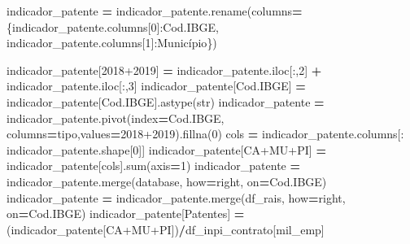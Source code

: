 \documentclass[
  12,
  dvipsnames]{article}
\newenvironment{Shaded}{\begin{snugshade}}{\end{snugshade}}
\newcommand{\BuiltInTok}[1]{#1}
\newcommand{\DecValTok}[1]{\textcolor[rgb]{0.00,0.00,0.81}{#1}}
\newcommand{\NormalTok}[1]{#1}
\newcommand{\OperatorTok}[1]{\textcolor[rgb]{0.81,0.36,0.00}{\textbf{#1}}}
\newcommand{\StringTok}[1]{\textcolor[rgb]{0.31,0.60,0.02}{#1}}
\begin{document}
\begin{Shaded}
\begin{Highlighting}[]
\NormalTok{indicador\_patente }\OperatorTok{=}\NormalTok{ indicador\_patente.rename(columns}\OperatorTok{=}\NormalTok{\{indicador\_patente.columns[}\DecValTok{0}\NormalTok{]:}\StringTok{\textquotesingle{}Cod.IBGE\textquotesingle{}}\NormalTok{,}
\NormalTok{                                                      indicador\_patente.columns[}\DecValTok{1}\NormalTok{]:}\StringTok{\textquotesingle{}Município\textquotesingle{}}\NormalTok{\})}

\NormalTok{indicador\_patente[}\StringTok{\textquotesingle{}2018+2019\textquotesingle{}}\NormalTok{] }\OperatorTok{=}\NormalTok{ indicador\_patente.iloc[:,}\DecValTok{2}\NormalTok{] }\OperatorTok{+}\NormalTok{ indicador\_patente.iloc[:,}\DecValTok{3}\NormalTok{]}
\NormalTok{indicador\_patente[}\StringTok{\textquotesingle{}Cod.IBGE\textquotesingle{}}\NormalTok{] }\OperatorTok{=}\NormalTok{ indicador\_patente[}\StringTok{\textquotesingle{}Cod.IBGE\textquotesingle{}}\NormalTok{].astype(}\BuiltInTok{str}\NormalTok{)}
\NormalTok{indicador\_patente }\OperatorTok{=}\NormalTok{ indicador\_patente.pivot(index}\OperatorTok{=}\StringTok{\textquotesingle{}Cod.IBGE\textquotesingle{}}\NormalTok{, columns}\OperatorTok{=}\StringTok{\textquotesingle{}tipo\textquotesingle{}}\NormalTok{,values}\OperatorTok{=}\StringTok{\textquotesingle{}2018+2019\textquotesingle{}}\NormalTok{).fillna(}\DecValTok{0}\NormalTok{)}
\NormalTok{cols }\OperatorTok{=}\NormalTok{ indicador\_patente.columns[: indicador\_patente.shape[}\DecValTok{0}\NormalTok{]]}
\NormalTok{indicador\_patente[}\StringTok{\textquotesingle{}CA+MU+PI\textquotesingle{}}\NormalTok{] }\OperatorTok{=}\NormalTok{ indicador\_patente[cols].}\BuiltInTok{sum}\NormalTok{(axis}\OperatorTok{=}\DecValTok{1}\NormalTok{)}
\NormalTok{indicador\_patente }\OperatorTok{=}\NormalTok{ indicador\_patente.merge(database, how}\OperatorTok{=}\StringTok{\textquotesingle{}right\textquotesingle{}}\NormalTok{, on}\OperatorTok{=}\StringTok{\textquotesingle{}Cod.IBGE\textquotesingle{}}\NormalTok{)}
\NormalTok{indicador\_patente }\OperatorTok{=}\NormalTok{ indicador\_patente.merge(df\_rais, how}\OperatorTok{=}\StringTok{\textquotesingle{}right\textquotesingle{}}\NormalTok{, on}\OperatorTok{=}\StringTok{\textquotesingle{}Cod.IBGE\textquotesingle{}}\NormalTok{)}
\NormalTok{indicador\_patente[}\StringTok{\textquotesingle{}Patentes\textquotesingle{}}\NormalTok{] }\OperatorTok{=}\NormalTok{ (indicador\_patente[}\StringTok{\textquotesingle{}CA+MU+PI\textquotesingle{}}\NormalTok{])}\OperatorTok{/}\NormalTok{df\_inpi\_contrato[}\StringTok{\textquotesingle{}mil\_emp\textquotesingle{}}\NormalTok{]}


\end{Highlighting}
\end{Shaded}
\end{document}
